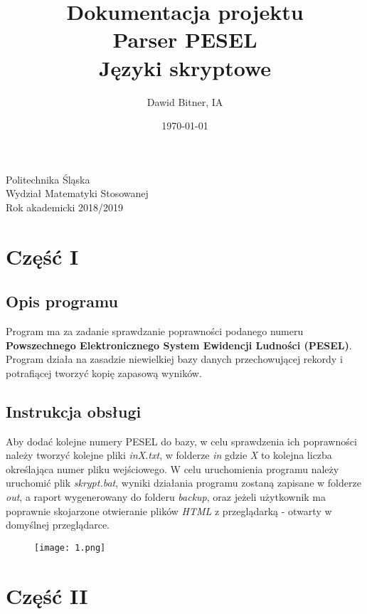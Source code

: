 \documentclass[12pt,a4paper]{article}
\begin{document}
	
	\title{Dokumentacja projektu\\ Parser PESEL \\ Języki skryptowe}
	\author{Dawid Bitner, IA}
	\date{\today}
	
	\maketitle
	\begin{center}				
		\vspace{14cm} Politechnika Śląska \\ Wydział Matematyki Stosowanej \\ Rok akademicki 2018/2019
	\end{center}
	\newpage 
	
	\section*{Część I}
	\subsection*{Opis programu}
	Program ma za zadanie sprawdzanie poprawności podanego numeru \textbf{Powszechnego Elektronicznego System Ewidencji Ludności (PESEL)}. Program działa na zasadzie niewielkiej bazy danych przechowującej rekordy i potrafiącej tworzyć kopię zapasową wyników.
	\subsection*{Instrukcja obsługi}
	Aby dodać kolejne numery PESEL do bazy, w celu sprawdzenia ich poprawności należy tworzyć kolejne pliki \textit{inX.txt}, w folderze \textit{in} gdzie \textit{X} to kolejna liczba określająca numer pliku wejściowego. W celu uruchomienia programu należy uruchomić plik \textit{skrypt.bat}, wyniki działania programu zostaną zapisane w folderze \textit{out}, a raport wygenerowany do folderu \textit{backup}, oraz jeżeli użytkownik ma poprawnie skojarzone otwieranie plików \textit{HTML} z przeglądarką - otwarty w domyślnej przeglądarce.
	\begin{figure}[ht]
    	\centering
  		\texttt{[image: 1.png]}    
    \end{figure}


\newpage
	\section*{Część II}
\end{document}
